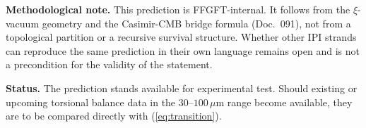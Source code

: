 \textbf{Methodological note.} This prediction is FFGFT-internal.
It follows from the $\xi$-vacuum geometry and the Casimir-CMB
bridge formula (Doc.~091), not from a topological partition or a
recursive survival structure. Whether other IPI strands can
reproduce the same prediction in their own language remains open
and is not a precondition for the validity of the statement.

\textbf{Status.} The prediction stands available for experimental
test. Should existing or upcoming torsional balance data in the
$30$--$100\,\mu$m range become available, they are to be compared
directly with (\ref{eq:transition}).
